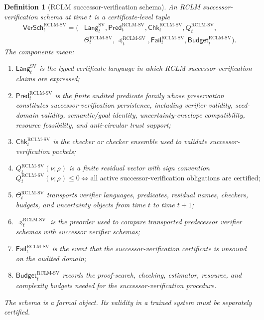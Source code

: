 \documentclass[11pt,a4paper]{article}
\newtheorem{definition}[theorem]{Definition}
\newcommand{\RCLM}{\mathrm{RCLM}}
\begin{document}
\begin{definition}[RCLM successor-verification schema]
\label{def:rclm-batch12-sv-schema}
An RCLM successor-verification schema at time \(t\) is a certificate-level tuple
\[
\begin{aligned}
\mathsf{VerSch}_t^{\RCLM\text{-}\mathrm{SV}}
=(&\mathsf{Lang}_t^{\mathrm{SV}},
\mathsf{Pred}_t^{\RCLM\text{-}\mathrm{SV}},
\mathsf{Chk}_t^{\RCLM\text{-}\mathrm{SV}},
Q_t^{\RCLM\text{-}\mathrm{SV}},\\
&\Theta_t^{\RCLM\text{-}\mathrm{SV}},
\preceq_t^{\RCLM\text{-}\mathrm{SV}},
\mathsf{Fail}_t^{\RCLM\text{-}\mathrm{SV}},
\mathsf{Budget}_t^{\RCLM\text{-}\mathrm{SV}}).
\end{aligned}
\]
The components mean:
\begin{enumerate}[label=(\roman*),leftmargin=1.5em]
    \item \(\mathsf{Lang}_t^{\mathrm{SV}}\) is the typed certificate language in which RCLM successor-verification claims are expressed;
    \item \(\mathsf{Pred}_t^{\RCLM\text{-}\mathrm{SV}}\) is the finite audited predicate family whose preservation constitutes successor-verification persistence, including verifier validity, seed-domain validity, semantic/goal identity, uncertainty-envelope compatibility, resource feasibility, and anti-circular trust support;
    \item \(\mathsf{Chk}_t^{\RCLM\text{-}\mathrm{SV}}\) is the checker or checker ensemble used to validate successor-verification packets;
    \item \(Q_t^{\RCLM\text{-}\mathrm{SV}}(\nu;\rho)\) is a finite residual vector with sign convention
    \[
    Q_t^{\RCLM\text{-}\mathrm{SV}}(\nu;\rho)\le0
    \Longleftrightarrow
    \text{all active successor-verification obligations are certified};
    \]
    \item \(\Theta_t^{\RCLM\text{-}\mathrm{SV}}\) transports verifier languages, predicates, residual names, checkers, budgets, and uncertainty objects from time \(t\) to time \(t+1\);
    \item \(\preceq_t^{\RCLM\text{-}\mathrm{SV}}\) is the preorder used to compare transported predecessor verifier schemas with successor verifier schemas;
    \item \(\mathsf{Fail}_t^{\RCLM\text{-}\mathrm{SV}}\) is the event that the successor-verification certificate is unsound on the audited domain;
    \item \(\mathsf{Budget}_t^{\RCLM\text{-}\mathrm{SV}}\) records the proof-search, checking, estimator, resource, and complexity budgets needed for the successor-verification procedure.
\end{enumerate}
The schema is a formal object. Its validity in a trained system must be separately certified.
\end{definition}
\end{document}
